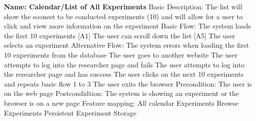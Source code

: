 \begin{outline}[enumerate]
\1 {\bf Name: Calendar/List of All Experiments}
\2 Basic Description: The list will show the soonest to be conducted experiments (10) and will allow for a user to click and view more information on the experiment
\2 Basic Flow:
\3 The system loads the first 10 experiments [A1]
\3 The user can scroll down the list [A5]
\3 The user selects an experiment
\2 Alternative Flow:
\3 [A1] The system errors when loading the first 10 experiments from the database
\3 [A2] The user goes to another website
\3 [A3] The user attempts to log into the researcher page and fails
\3 [A4] The user attempts to log into the researcher page and has success
\3 [A5] The user clicks on the next 10 experiments and repeats basic flow 1 to 3
\3 [A6] The user exits the browser
\2 Precondition:
\3 The user is on the web page
\2 Postcondidtion:
\3 The system is showing an experiment or the browser is on a new page
\2 Feature mapping:
\3 All calendar Experiments
\3 Browse Experiments
\3 Persistent Experiment Storage



\end{outline}
